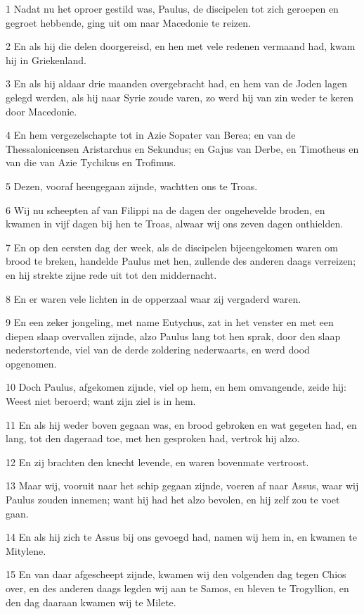 \par 1 Nadat nu het oproer gestild was, Paulus, de discipelen tot zich geroepen en gegroet hebbende, ging uit om naar Macedonie te reizen.
\par 2 En als hij die delen doorgereisd, en hen met vele redenen vermaand had, kwam hij in Griekenland.
\par 3 En als hij aldaar drie maanden overgebracht had, en hem van de Joden lagen gelegd werden, als hij naar Syrie zoude varen, zo werd hij van zin weder te keren door Macedonie.
\par 4 En hem vergezelschapte tot in Azie Sopater van Berea; en van de Thessalonicensen Aristarchus en Sekundus; en Gajus van Derbe, en Timotheus en van die van Azie Tychikus en Trofimus.
\par 5 Dezen, vooraf heengegaan zijnde, wachtten ons te Troas.
\par 6 Wij nu scheepten af van Filippi na de dagen der ongehevelde broden, en kwamen in vijf dagen bij hen te Troas, alwaar wij ons zeven dagen onthielden.
\par 7 En op den eersten dag der week, als de discipelen bijeengekomen waren om brood te breken, handelde Paulus met hen, zullende des anderen daags verreizen; en hij strekte zijne rede uit tot den middernacht.
\par 8 En er waren vele lichten in de opperzaal waar zij vergaderd waren.
\par 9 En een zeker jongeling, met name Eutychus, zat in het venster en met een diepen slaap overvallen zijnde, alzo Paulus lang tot hen sprak, door den slaap nederstortende, viel van de derde zoldering nederwaarts, en werd dood opgenomen.
\par 10 Doch Paulus, afgekomen zijnde, viel op hem, en hem omvangende, zeide hij: Weest niet beroerd; want zijn ziel is in hem.
\par 11 En als hij weder boven gegaan was, en brood gebroken en wat gegeten had, en lang, tot den dageraad toe, met hen gesproken had, vertrok hij alzo.
\par 12 En zij brachten den knecht levende, en waren bovenmate vertroost.
\par 13 Maar wij, vooruit naar het schip gegaan zijnde, voeren af naar Assus, waar wij Paulus zouden innemen; want hij had het alzo bevolen, en hij zelf zou te voet gaan.
\par 14 En als hij zich te Assus bij ons gevoegd had, namen wij hem in, en kwamen te Mitylene.
\par 15 En van daar afgescheept zijnde, kwamen wij den volgenden dag tegen Chios over, en des anderen daags legden wij aan te Samos, en bleven te Trogyllion, en den dag daaraan kwamen wij te Milete.
